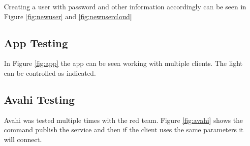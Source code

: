 Creating a user with password and other information accordingly can be seen in Figure \ref{fig:newuser} and \ref{fig:newusercloud}



\subsection{App Testing}
In Figure \ref{fig:app} the app can be seen working with multiple clients. The light can be controlled as indicated.

\subsection{Avahi Testing}

Avahi was tested multiple times with the red team. Figure \ref{fig:avahi} shows the command publish the service and then if the client uses the same parameters it will connect. 